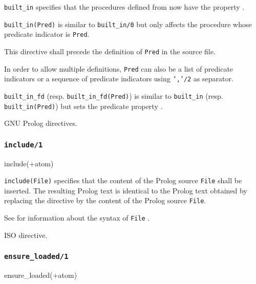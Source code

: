 \Description

\texttt{built\_in} specifies that the procedures defined from
now have the  property .

\texttt{built\_in(Pred)} is similar to \texttt{built\_in/0} but
only affects the procedure whose predicate indicator is \texttt{Pred}.

This directive shall precede the definition of \texttt{Pred} in the source
file.

In order to allow multiple definitions, \texttt{Pred} can also be a list of
predicate indicators or a sequence of predicate indicators using
\texttt{','/2} as separator.

\texttt{built\_in\_fd} (resp.
\texttt{built\_in\_fd(Pred)}) is similar to
\texttt{built\_in} (resp. \texttt{built\_in(Pred)}) but sets the
 predicate property .

\Portability

GNU Prolog directives.

\subsubsection{\texttt{include/1}}

\begin{TemplatesOneCol}
include(+atom)

\end{TemplatesOneCol}

\Description

\texttt{include(File)} specifies that the content of the Prolog source
\texttt{File} shall be inserted. The resulting Prolog text is identical to
the Prolog text obtained by replacing the directive by the content of the
Prolog source \texttt{File}.

See  for information about the syntax of
\texttt{File} .

\Portability

ISO directive.

\subsubsection{\texttt{ensure\_loaded/1}}

\begin{TemplatesOneCol}
ensure\_loaded(+atom)

\end{TemplatesOneCol}

